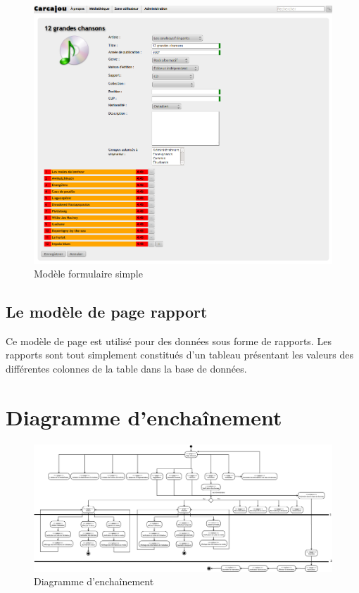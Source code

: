\documentclass[letter, 11pt]{report}
\begin{document}
\begin{figure}[htbp]
	\begin{center}
		\includegraphics[scale=0.4]{captures_ecran/modele_details_medias.png}
	\end{center}
	\caption{Modèle formulaire simple}
\end{figure}

\subsection{Le modèle de page rapport}

Ce modèle de page est utilisé pour des données sous forme de rapports. Les rapports sont tout simplement constitués d'un tableau présentant les valeurs des différentes colonnes de la table dans la base de données.

\section{Diagramme d'enchaînement}

\begin{figure}[htbp]
	\begin{center}
		\includegraphics[scale=0.13]{diagrammeEnchainement.png}
	\end{center}
	\caption{Diagramme d'enchaînement}
\end{figure}
\end{document}

